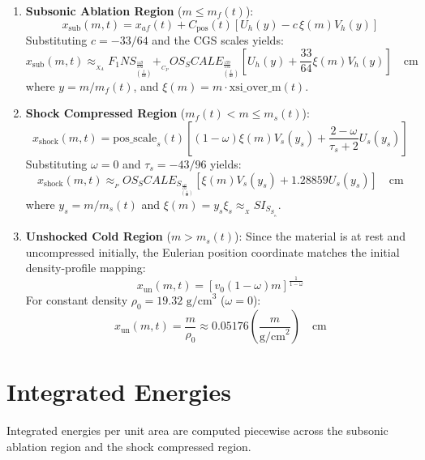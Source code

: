 \documentclass[11pt]{article}
\begin{document}
\begin{enumerate}
    \item \textbf{Subsonic Ablation Region} ($m \le m_f(t)$):
    \begin{equation}
        x_{\text{sub}}(m,t) = x_{af}(t) + C_{\text{pos}}(t) \left[ U_h(y) - c \, \xi(m) V_h(y) \right]
    \end{equation}
    Substituting $c = -33/64$ and the CGS scales yields:
    \begin{equation}
        x_{\text{sub}}(m,t) \approx __X_AF_1NS__ \left(\frac{t}{\text{ns}}\right)^{\frac{149}{192}} + __C_POS_SCALE__ \left(\frac{t}{\text{ns}}\right)^{\frac{199}{192}} \left[ U_h(y) + \frac{33}{64} \xi(m) V_h(y) \right] \quad \text{cm}
    \end{equation}
    where $y = m/m_f(t)$, and $\xi(m) = m \cdot \text{xsi\_over\_m}(t)$.

    \item \textbf{Shock Compressed Region} ($m_f(t) < m \le m_s(t)$):
    \begin{equation}
        x_{\text{shock}}(m,t) = \text{pos\_scale}_s(t) \left[ (1-\omega)\xi(m) V_s(y_s) + \frac{2-\omega}{\tau_s+2} U_s(y_s) \right]
    \end{equation}
    Substituting $\omega = 0$ and $\tau_s = -43/96$ yields:
    \begin{equation}
        x_{\text{shock}}(m,t) \approx __POS_SCALE_S__ \left(\frac{t}{\text{ns}}\right)^{\frac{149}{192}} \left[ \xi(m) V_s(y_s) + 1.28859 U_s(y_s) \right] \quad \text{cm}
    \end{equation}
    where $y_s = m/m_s(t)$ and $\xi(m) = y_s \xi_s \approx __XSI_S_S__ y_s$.

    \item \textbf{Unshocked Cold Region} ($m > m_s(t)$):
    Since the material is at rest and uncompressed initially, the Eulerian position coordinate matches the initial density-profile mapping:
    \begin{equation}
        x_{\text{un}}(m,t) = \left[ v_0 (1-\omega) m \right]^{\frac{1}{1-\omega}}
    \end{equation}
    For constant density $\rho_0 = 19.32 \text{ g/cm}^3$ ($\omega = 0$):
    \begin{equation}
        x_{\text{un}}(m,t) = \frac{m}{\rho_0} \approx 0.05176 \left( \frac{m}{\text{g/cm}^2} \right) \quad \text{cm}
    \end{equation}
\end{enumerate}

\section{Integrated Energies}
Integrated energies per unit area are computed piecewise across the subsonic ablation region and the shock compressed region.
\end{document}
